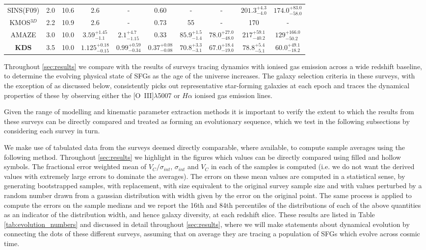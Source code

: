 \documentclass[fleqn,usenatbib]{mn2e}
\begin{document}
\begin{table*}
\begin{threeparttable}
\begin{tabular}{c c c c c c c c c c }
 SINS(F09) & 2.0 & 10.6 & 2.6 & - & 0.60 & - & - & $201.3^{+4.3}_{-4.0}$ & $174.0^{+83.0}_{-58.0}$ \\
 KMOS$^{3D}$ & 2.2 & 10.9 & 2.6 & - & 0.73 & 55 & - & 170 & - \\
 AMAZE & 3.0 & 10.0 & $3.59^{+1.45}_{-1.1}$ & $2.1^{+4.7}_{-1.15}$ & 0.33 & $85.9^{+1.5}_{-1.4}$ & $78.0^{+27.0}_{-48.0}$ & $217^{+59.1}_{-40.2}$ & $129^{+166.0}_{-50.2}$ \\
 \textbf{KDS} & 3.5 & 10.0 & $1.125^{+0.18}_{-0.15}$ & $0.99^{+0.59}_{-0.34}$ & $0.37^{+0.08}_{-0.08}$ & $70.8^{+3.3}_{-3.1}$ & $67.0^{+18.4}_{-19.0}$ & $78.8^{+5.4}_{-5.1}$ & $60.0^{+49.1}_{-18.2}$ \\
 \hline
\end{tabular}
  \end{threeparttable}
  \end{table*}

Throughout \cref{sec:results} we compare with the results of surveys tracing dynamics with ionised gas emission across a wide redshift baseline, to determine the evolving physical state of SFGs as the age of the universe increases.
The galaxy selection criteria in these surveys, with the exception of \cite{Green2014} as discussed below, consistently picks out representative star-forming galaxies at each epoch and traces the dynamical properties of these by observing either the [O~{\sc III}]$\lambda$5007 or $H\alpha$ ionised gas emission lines.

Given the range of modelling and kinematic parameter extraction methods it is important to verify the extent to which the results from these surveys can be directly compared and treated as forming an evolutionary sequence, which we test in the following subsections by considering each survey in turn.

We make use of tabulated data from the surveys deemed directly comparable, where available, to compute sample averages using the following method. 
Throughout \cref{sec:results} we highlight in the figures which values can be directly compared using filled and hollow symbols.
The fractional error weighted mean of $V_{C}/\sigma_{int}$, $\sigma_{int}$ and $V_{C}$ in each of the samples is computed (i.e. we do not want the derived values with extremely large errors to dominate the averages).
The errors on these mean values are computed in a statistical sense, by generating bootstrapped samples, with replacement, with size equivalent to the original survey sample size and with values perturbed by a random number drawn from a gaussian distribution with width given by the error on the original point.
The same process is applied to compute the errors on the sample medians and we report the 16th and 84th percentiles of the distributions of each of the above quantities as an indicator of the distribution width, and hence galaxy diversity, at each redshift slice.
These results are listed in Table \ref{tab:evolution_numbers} and discussed in detail throughout \cref{sec:results}, where we will make statements about dynamical evolution by connecting the dots of these different surveys, assuming that on average they are tracing a population of SFGs which evolve across cosmic time. 
\end{document}
